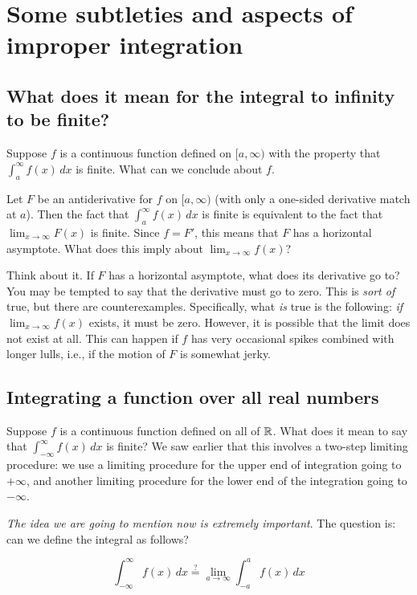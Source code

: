 \documentclass[10pt]{amsart}
\begin{document}
\section{Some subtleties and aspects of improper integration}

\subsection{What does it mean for the integral to infinity to be finite?}

Suppose $f$ is a continuous function defined on $[a,\infty)$ with the
property that $\int_a^\infty f(x) \, dx$ is finite. What can we
conclude about $f$.

Let $F$ be an antiderivative for $f$ on $[a,\infty)$ (with only a
one-sided derivative match at $a$). Then the fact that $\int_a^\infty
f(x) \, dx$ is finite is equivalent to the fact that $\lim_{x \to
\infty} F(x)$ is finite. Since $f = F'$, this means that $F$ has a
horizontal asymptote. What does this imply about $\lim_{x \to \infty}
f(x)$?

Think about it. If $F$ has a horizontal asymptote, what does its
derivative go to? You may be tempted to say that the derivative must
go to zero. This is {\em sort of} true, but there are
counterexamples. Specifically, what {\em is} true is the following:
{\em if} $\lim_{x \to \infty} f(x)$ exists, it must be zero. However,
it is possible that the limit does not exist at all. This can happen
if $f$ has very occasional spikes combined with longer lulls, i.e., if
the motion of $F$ is somewhat jerky.

\subsection{Integrating a function over all real numbers}

Suppose $f$ is a continuous function defined on all of $\mathbb{R}$. What does
it mean to say that $\int_{-\infty}^{\infty} f(x) \, dx$ is finite? We
saw earlier that this involves a two-step limiting procedure: we use a
limiting procedure for the upper end of integration going to
$+\infty$, and another limiting procedure for the lower end of the
integration going to $-\infty$.

{\em The idea we are going to mention now is extremely important}. The
question is: can we define the integral as follows?

$$\int_{-\infty}^\infty f(x) \, dx \stackrel{?}{=} \lim_{a \to \infty} \int_{-a}^a f(x) \, dx$$
\end{document}
